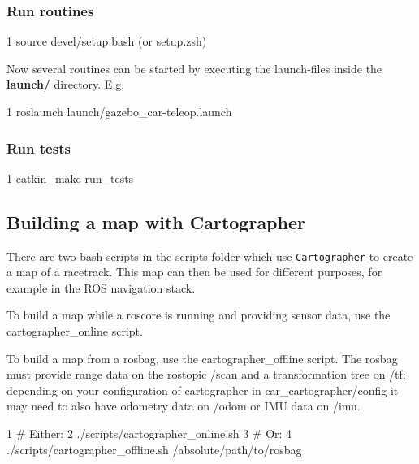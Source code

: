 \subsubsection*{Run routines}


\begin{DoxyCode}
1 source devel/setup.bash (or setup.zsh)
\end{DoxyCode}


Now several routines can be started by executing the launch-\/files inside the {\bfseries launch/} directory. E.\+g.


\begin{DoxyCode}
1 roslaunch launch/gazebo\_car-teleop.launch
\end{DoxyCode}


\subsubsection*{Run tests}


\begin{DoxyCode}
1 catkin\_make run\_tests
\end{DoxyCode}


\subsection*{Building a map with Cartographer}

There are two bash scripts in the {\ttfamily scripts} folder which use \href{https://github.com/googlecartographer/cartographer_ros}{\tt Cartographer} to create a map of a racetrack. This map can then be used for different purposes, for example in the R\+OS navigation stack.


\begin{DoxyItemize}
\item To build a map while a roscore is running and providing sensor data, use the {\ttfamily cartographer\+\_\+online} script.
\item To build a map from a rosbag, use the {\ttfamily cartographer\+\_\+offline} script. The rosbag must provide range data on the rostopic {\ttfamily /scan} and a transformation tree on {\ttfamily /tf}; depending on your configuration of cartographer in {\ttfamily car\+\_\+cartographer/config} it may need to also have odometry data on {\ttfamily /odom} or I\+MU data on {\ttfamily /imu}.
\end{DoxyItemize}


\begin{DoxyCode}
1 # Either:
2 ./scripts/cartographer\_online.sh
3 # Or:
4 ./scripts/cartographer\_offline.sh /absolute/path/to/rosbag
\end{DoxyCode}



